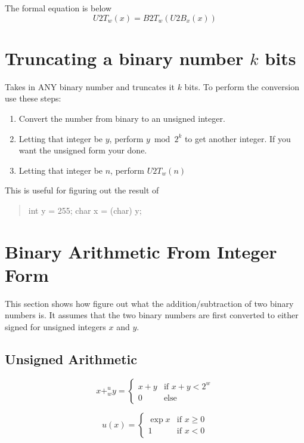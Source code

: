 \documentclass[12pt]{article}
\begin{document}
The formal equation is below
\begin{equation}
U2T_w(x)=B2T_w(U2B_x(x))
\end{equation}

\section{Truncating a binary number $k$ bits}
Takes in ANY binary number and truncates it $k$ bits. To perform the conversion use these steps:
\begin{enumerate}
\item Convert the number from binary to an unsigned integer. 
\item Letting that integer be $y$, perform $y \bmod 2^k$ to get another integer. If you want the unsigned form your done.
\item Letting that integer be $n$, perform $U2T_w(n)$
\end{enumerate}
This is useful for figuring out the result of
\begin{verse}
int y = 255;
char x = (char) y;
\end{verse}

\section{Binary Arithmetic From Integer Form}
This section shows how figure out what the addition/subtraction of two binary numbers is. It assumes that the two binary numbers are first converted to either signed for unsigned integers $x$ and $y$.
\subsection{Unsigned Arithmetic}
\begin{equation}
x+_w^u y = \begin{cases}
x+y & \text{if } x + y < 2^w \\
0 & \text{else }
\end{cases}
\end{equation}

\[
 u(x) =
  \begin{cases}
   \exp{x} & \text{if } x \geq 0 \\
   1       & \text{if } x < 0
  \end{cases}
\]
\end{document}
